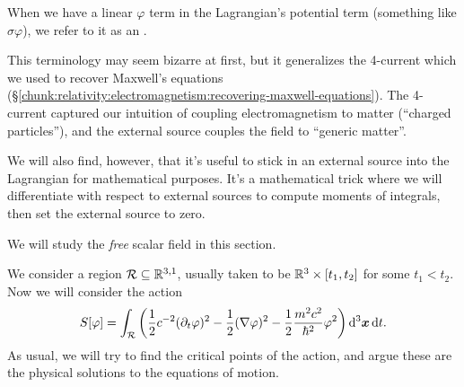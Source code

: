 \begin{definition}
When we have a linear $\varphi$ term in the Lagrangian's potential term
(something like $\sigma\varphi$), we refer to it as an
.
\end{definition}

\begin{remark}
This terminology may seem bizarre at first, but it generalizes the
4-current which we used to recover Maxwell's equations (\S\ref{chunk:relativity:electromagnetism:recovering-maxwell-equations}).
The 4-current captured our intuition of coupling electromagnetism to
matter (``charged particles''), and the external source couples the
field to ``generic matter''.

We will also find, however, that it's useful to stick in an external
source into the Lagrangian for mathematical purposes. It's a
mathematical trick where we will differentiate with respect to external
sources to compute moments of integrals, then set the external source to
zero. 
\end{remark}

We will study the \emph{free} scalar field in this section. 

We consider a region $\mathcal{R}\subseteq\mathbb{R}^{3,1}$, usually taken to be
$\mathbb{R}^{3}\times[t_{1},t_{2}]$ for some $t_{1}<t_{2}$. Now we will
consider the action
\begin{equation}
S[\varphi] = \int_{\mathcal{R}}\left(\frac{1}{2}c^{-2}(\partial_{t}\varphi)^{2}-\frac{1}{2}(\nabla\varphi)^{2}
-\frac{1}{2}\frac{m^{2}c^{2}}{\hbar^{2}}\varphi^{2}\right)\mathrm{d}^{3}\boldsymbol{x}\,\mathrm{d} t.
\end{equation}
As usual, we will try to find the critical points of the action, and
argue these are the physical solutions to the equations of motion.

